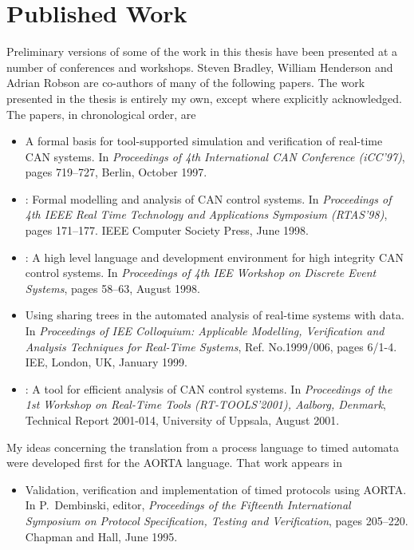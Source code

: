 \chapter*{Published Work}
Preliminary versions of some of the work in this thesis have been presented at
a number of conferences and workshops. Steven Bradley, William
Henderson and Adrian Robson are co-authors of many of the following
papers.  The work presented in the thesis is entirely my own, except where
explicitly acknowledged. The papers, in chronological order, are
\begin{itemize}
\item
\newblock A formal basis for tool-supported simulation and verification of
  real-time {CAN} systems.
\newblock In {\em Proceedings of 4th International {CAN} Conference
  {(iCC'97)}}, pages 719--727, Berlin, October 1997. 

\item
\newblock \bcandle: Formal modelling and analysis of {CAN} control systems.
\newblock In {\em Proceedings of 4th IEEE Real Time Technology and Applications
  Symposium (RTAS'98)}, pages 171--177. IEEE Computer Society Press, June 1998.

\item
\newblock \candle: A high level language and development environment for high
  integrity {CAN} control systems.
\newblock In {\em Proceedings of 4th IEE Workshop on Discrete Event Systems}, 
  pages 58--63, August 1998.

\item 
\newblock Using sharing trees in the automated analysis of real-time systems 
  with data.
\newblock In {\em Proceedings of IEE Colloquium: Applicable Modelling, 
  Verification and Analysis Techniques for Real-Time Systems}, 
  Ref. No.1999/006, pages 6/1-4. IEE, London, UK, January 1999.

\item
\newblock \candle: A tool for efficient analysis of CAN control systems.
\newblock In {\em Proceedings of the 1st Workshop on Real-Time Tools 
  (RT-TOOLS'2001), Aalborg, Denmark}, Technical Report 2001-014, 
  University of Uppsala, August 2001.
\end{itemize}

My ideas concerning the translation from a process language to timed automata
were developed first for the AORTA language. That work appears in
\begin{itemize}
\item 
\newblock Validation, verification and implementation of timed protocols using
  {AORTA}.
\newblock In P.~Dembinski, editor, {\em Proceedings of the Fifteenth
  International Symposium on Protocol Specification, Testing and Verification},
  pages 205--220. Chapman and Hall, June 1995.
\end{itemize}
